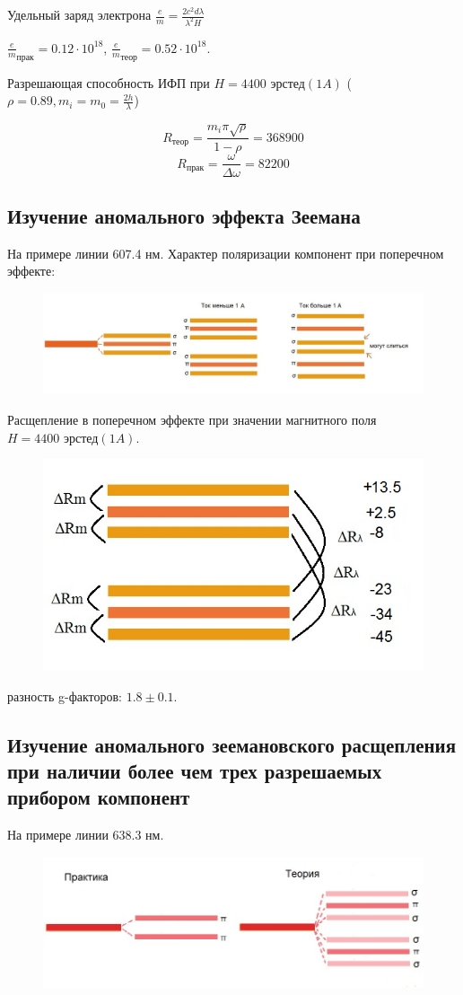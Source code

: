 Удельный заряд электрона $\frac{e}{m} = \frac{2c^2d\lambda}{\lambda^2 H}$

$\frac{e}{m}_{\text{прак}} = 0.12\cdot10^{18}$, $\frac{e}{m}_{\text{теор}} = 0.52\cdot 10^{18}$.

Разрешающая способность ИФП  при $H=4400 \text{ эрстед} (1 A)$ ($\rho=0.89, m_i=m_0=\frac{2h}{\lambda}$)

$$R_{\text{теор}}=\frac{m_i \pi \sqrt{\rho}}{1-\rho}= 368 900$$
$$R_{\text{прак}}=\frac{\omega}{\Delta \omega}= 82 200$$ 

\subsection{Изучение аномального эффекта Зеемана}
На примере линии 607.4 нм.
Характер поляризации компонент при поперечном эффекте:
\begin{figure}[H]
	\centering
	\includegraphics[width=\linewidth]{fig/fig17}
	\caption{}
	\label{fig:fig18}
\end{figure}

Расщепление в поперечном эффекте при значении магнитного поля $H=4400 \text{ эрстед} (1 A)$.
\begin{figure}[H]
	\centering
	\includegraphics[width=0.5\linewidth]{fig/fig18}
	\caption{}
	\label{fig:fig19}
\end{figure}

разность g-факторов: $1.8 \pm 0.1$.

\subsection{Изучение аномального зеемановского расщепления при наличии более чем трех разрешаемых прибором компонент}
На примере линии 638.3 нм.
\begin{figure}[H]
	\centering
	\includegraphics[width=0.8\linewidth]{fig/fig19}
	\caption{}
	\label{fig:fig20}
\end{figure}

